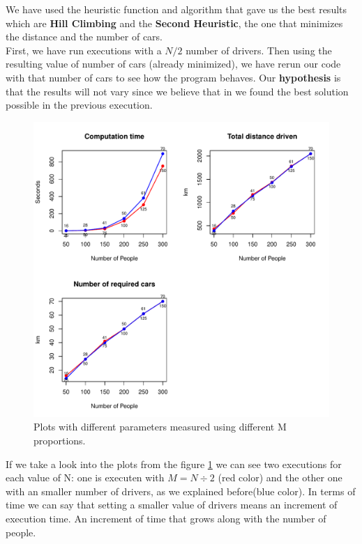 \documentclass[12]{article}
\begin{document}
We have used the heuristic function and algorithm that gave us the best results which are \textbf{Hill Climbing} and the \textbf{Second Heuristic}, the one that minimizes the distance and the number of cars.
\\

First, we have run executions with a $N/2$ number of drivers. Then using the resulting value of number of cars (already minimized), we have rerun our code with that number of cars to see how the program behaves. Our \textbf{hypothesis} is that the results will not vary since we believe that in we found the best solution possible in the previous execution. 


\begin{figure}[H]
  \captionsetup{justification=centering}
   \centering
    \includegraphics[scale=0.8]{Results/data_7.pdf}
      \caption{Plots with different parameters measured using different M proportions.}
      \label{fig:data7}
  \end{figure}
    \vspace{1cm}
    
 If we take a look into the plots from the figure \ref{fig:data7} we can see two executions for each value of N: one is executen with $M = N\div2$ (red color) and the other one with an smaller number of drivers, as we explained before(blue color). In terms of time we can say that setting a smaller value of drivers means an increment of execution time. An increment of time that grows along with the number of people. 
 
\end{document}
